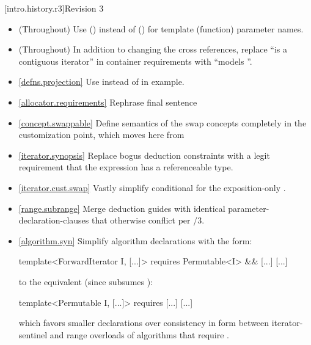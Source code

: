 [intro.history.r3]{Revision 3}
\begin{itemize}
\item (Throughout) Use  () instead of  () for
   template (function) parameter names.
\item (Throughout) In addition to changing the cross references, replace
  ``is a contiguous iterator'' in container requirements with ``models
  ''.
\item \ref{defns.projection} Use  instead of 
  in example.
\item \ref{allocator.requirements} Rephrase final sentence
\item \ref{concept.swappable} Define semantics of the swap concepts completely in
  the  customization point, which moves here from 
\item \ref{iterator.synopsis} Replace bogus 
  deduction constraints with a legit requirement that the expression has
  a referenceable type.
\item \ref{iterator.cust.swap} Vastly simplify conditional
   for the exposition-only .
\item \ref{range.subrange} Merge  deduction guides with identical
  parameter-declaration-clauses that otherwise conflict per
  /3.
\item \ref{algorithm.syn} Simplify algorithm declarations with the form:
\begin{codeblock}
template<ForwardIterator I, [...]>
  requires Permutable<I> && [...]
[...]
\end{codeblock}
to the equivalent (since  subsumes ):
\begin{codeblock}
template<Permutable I, [...]>
  requires [...]
[...]
\end{codeblock}
which favors smaller declarations over consistency in form between
iterator-sentinel and range overloads of algorithms that require
.
\end{itemize}

